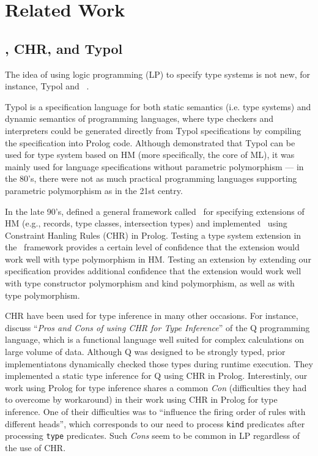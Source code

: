 \section{Related Work}\label{sec:relwork}
\subsection{\HMX, CHR, and Typol}
The idea of using logic programming (LP) to specify type systems is not new,
for instance, Typol \cite{Despeyroux84} and \HMX\ \cite{HMX99}.

Typol is a specification language for both static semantics (i.e. type systems)
and dynamic semantics of programming languages, where type checkers and
interpreters could be generated directly from Typol specifications
by compiling the specification into Prolog code. Although \citet{Despeyroux84}
demonstrated that Typol can be used for type system based on HM (more
specifically, the core of ML), it was mainly used for language specifications
without parametric polymorphism --- in the 80's, there were not as much
practical programming languages supporting parametric polymorphism as
in the 21st centry.

In the late 90's, \citet*{HMX99} defined a general framework called \HMX\ for
specifying extensions of HM (e.g., records, type classes, intersection types)
and \citet{tyinferCHR02} implemented \HMX\ using Constraint Hanling Rules (CHR)
in Prolog. Testing a type system extension in the \HMX\ framework provides
a certain level of confidence that the extension would work well with
type polymorphism in HM. Testing an extension by extending our specification
provides additional confidence that the extension would work well with
type constructor polymorphism and kind polymorphism, as well as
with type polymorphism.

CHR have been used for type inference in many other occasions. For instance,
\citet{CsorbaCHRforTyInf12} discuss ``\emph{Pros and Cons of using CHR for
Type Inference}'' of the Q programming language, which is a functional
language well suited for complex calculations on large volume of data.
Although Q was designed to be strongly typed, prior implementiatons dynamically
checked those types during runtime execution. They implemented a static type
inference for Q using CHR in Prolog. Interestinly, our work using Prolog for
type inference shares a common \emph{Con} (difficulties they had to overcome
by workaround) in their work using CHR in Prolog for type inference.
One of their difficulties was to ``influence the firing order of rules
with different heads'', which corresponds to our need to process \texttt{kind}
predicates after processing \texttt{type} predicates. Such \emph{Cons} seem
to be common in LP regardless of the use of CHR.

